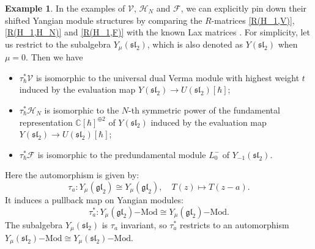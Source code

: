 \documentclass[10pt]{amsart}
\theoremstyle{definition}
\newtheorem{Example}[Theorem]{Example}
\numberwithin{equation}{section}
\newcommand{\bC}{\mathbb{C}}
\begin{document}
\begin{Example}\label{ex H_N, V, F}
In the examples of $\mathcal V$, $\mathcal H_N$ and $\mathcal F$, we can explicitly pin down their shifted Yangian module structures by comparing the $R$-matrices \eqref{R(H_1,V)}, \eqref{R(H_1,H_N)} and \eqref{R(H_1,F)} with the known Lax matrices \cite{FPT}. For simplicity, let us
restrict to the subalgebra $Y_{\mu}(\mathfrak{sl}_2)$, which is also denoted 
as $Y(\mathfrak{sl}_2)$ when $\mu=0$. Then we have
\begin{itemize}
\item $\tau_{\hbar}^*\mathcal V$ is isomorphic to the universal dual Verma module with highest weight $t$ induced by the evaluation map $Y(\mathfrak{sl}_2)\to U(\mathfrak{sl}_2)[\hbar]$;
\item $\tau_{\hbar}^*\mathcal H_N$ is isomorphic to the $N$-th symmetric power of the fundamental representation $\bC[\hbar]^{\oplus 2}$ of $Y(\mathfrak{sl}_2)$ induced by the evaluation map $Y(\mathfrak{sl}_2)\to U(\mathfrak{sl}_2)[\hbar]$;
\item $\tau_{\hbar}^*\mathcal F$ is isomorphic to the predundamental module $L^{-}_0$ of $Y_{-1}(\mathfrak{sl}_2)$.
\end{itemize}
Here the automorphism is given by: 
$$\tau_{a}\colon Y_{\mu}(\mathfrak{gl}_2)\cong Y_{\mu}(\mathfrak{gl}_2), \quad T(z)\mapsto T(z-a). $$ 
It induces a pullback map on Yangian modules: 
\begin{equation}\label{equ on tau pb}\tau_{a}^*\colon Y_{\mu}(\mathfrak{gl}_2)\mathrm{-Mod}\cong Y_{\mu}(\mathfrak{gl}_2)\mathrm{-Mod}. \end{equation}
The subalgebra $Y_{\mu}(\mathfrak{sl}_2)$ is $\tau_a$ invariant, so $\tau_{a}^*$ restricts to an automorphism $Y_{\mu}(\mathfrak{sl}_2)\mathrm{-Mod}\cong Y_{\mu}(\mathfrak{sl}_2)\mathrm{-Mod}$.
\end{Example}
\end{document}
